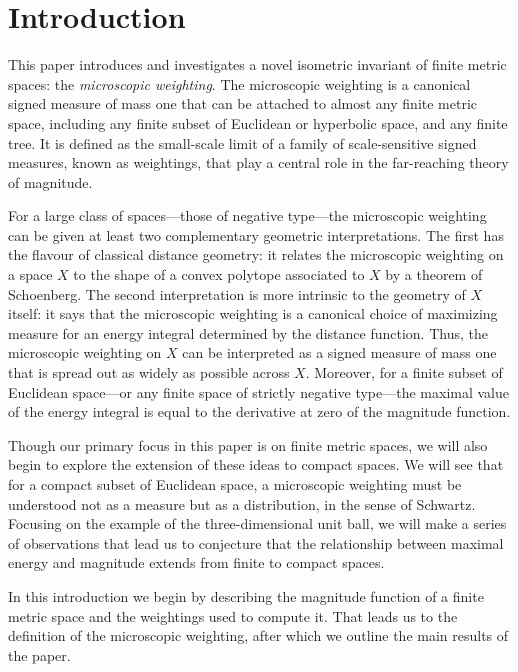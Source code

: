 \documentclass[a4paper, oneside, reqno]{amsart}
\theoremstyle{definition}
\theoremstyle{remark}
\numberwithin{equation}{section}
\newcommand{\demph}[1]{\emph{#1}}
\begin{document}
\section{Introduction}
\label{sec:introduction}

This paper introduces and investigates a novel isometric invariant of finite metric spaces: the \demph{microscopic weighting}. The microscopic weighting is a canonical signed measure of mass one that can be attached to almost any finite metric space, including any finite subset of Euclidean or hyperbolic space, and any finite tree. It is defined as the small-scale limit of a family of scale-sensitive signed measures, known as weightings, that play a central role in the far-reaching theory of magnitude.

For a large class of spaces---those of negative type---the microscopic weighting can be given at least two complementary geometric interpretations. The first has the flavour of classical distance geometry: it relates the microscopic weighting on a space \(X\) to the shape of a convex polytope associated to \(X\) by a theorem of Schoenberg. The second interpretation is more intrinsic to the geometry of \(X\) itself: it says that the microscopic weighting is a canonical choice of maximizing measure for an energy integral determined by the distance function. Thus, the microscopic weighting on \(X\) can be interpreted as a signed measure of mass one that is spread out as widely as possible across \(X\). Moreover, for a finite subset of Euclidean space---or any finite space of strictly negative type---the maximal value of the energy integral is equal to the derivative at zero of the magnitude function.

Though our primary focus in this paper is on finite metric spaces, we will also begin to explore the extension of these ideas to compact spaces. We will see that for a compact subset of Euclidean space, a microscopic weighting must be understood not as a measure but as a distribution, in the sense of Schwartz. Focusing on the example of the three-dimensional unit ball, we will make a series of observations that lead us to conjecture that the relationship between maximal energy and magnitude extends from finite to compact spaces.

In this introduction we begin by describing the magnitude function of a finite metric space and the weightings used to compute it. That leads us to the definition of the microscopic weighting, after which we outline the main results of the paper.
\end{document}
